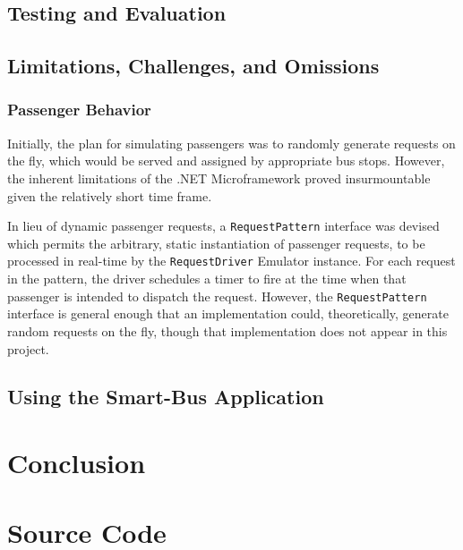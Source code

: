 \documentclass[runningheads]{llncs}
\begin{document}
\subsection{Testing and Evaluation}
\subsection{Limitations, Challenges, and Omissions}
\subsubsection{Passenger Behavior}
\label{sub:passengers}
Initially, the plan for simulating passengers was to randomly generate requests on the fly, which would be served and assigned by appropriate bus stops. However, the inherent limitations of the .NET Microframework proved insurmountable given the relatively short time frame.

In lieu of dynamic passenger requests, a \lstinline{RequestPattern} interface was devised which permits the arbitrary, static instantiation of passenger requests, to be processed in real-time by the \lstinline{RequestDriver} Emulator instance. For each request in the pattern, the driver schedules a timer to fire at the time when that passenger is intended to dispatch the request. However, the \lstinline{RequestPattern} interface is general enough that an implementation could, theoretically, generate random requests on the fly, though that implementation does not appear in this project.

\subsection{Using the Smart-Bus Application}

\section{Conclusion}

\newpage
\appendix
\section{Source Code}

% 
\end{document}
